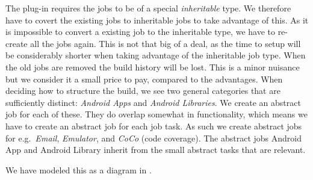 The plug-in requires the jobs to be of a special \emph{inheritable} type. We therefore have to covert the existing jobs to inheritable jobs to take advantage of this. As it is impossible to convert a existing job to the inheritable type, we have to re-create all the jobs again. This is not that big of a deal, as the time to setup will be considerably shorter when taking advantage of the inheritable job type. When the old jobs are removed the build history will be lost. This is a minor nuisance but we consider it a small price to pay, compared to the advantages. When deciding how to structure the build, we see two general categories that are sufficiently distinct: \emph{Android Apps} and \emph{Android Libraries}. We create an abstract job for each of these. They do overlap somewhat in functionality, which means we have to create an abstract job for each job task. As such we create abstract jobs for e.g.\ \emph{Email}, \emph{Emulator}, and \emph{CoCo} (code coverage). The abstract jobs Android App and Android Library inherit from the small abstract tasks that are relevant.

We have modeled this as a diagram in .

